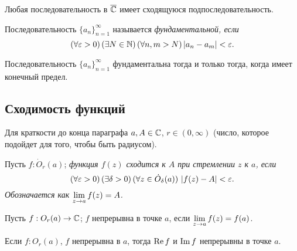 \begin{proposition}
	Любая последовательность в $\overline {\mathbb{C}}$ имеет сходящуюся подпоследовательность.
\end{proposition}


\begin{definition}
	Последовательность ${\{ a_n \}}_{n = 1}^\infty$ называется \it{фундаментальной}, если
	\[
		(\forall \varepsilon > 0) \, (\exists N \in \mathbb{N}) \, (\forall n, m > N) \, \mathopen{}\left\lvert a_n - a_m\right\rvert\mathclose{} < \varepsilon.
	\]
\end{definition}

\begin{proposition}
	Последовательность ${\{ a_n \}}_{n = 1}^\infty$ фундаментальна тогда и только тогда, когда имеет конечный предел.
\end{proposition}

\subsection{Сходимость функций}

Для краткости до конца параграфа $a, A \in \mathbb{C}$, $r \in (0, \infty)$ (число, которое подойдет для того, чтобы быть радиусом).

\begin{definition}
	Пусть $f: \dot{O}_r(a)$; \it{функция} $f(z)$ \it{сходится} к $A$ при стремлении $z$ к $a$, если
	\[
		(\forall \varepsilon > 0) \, (\exists \delta > 0) \, (\forall z \in \dot{O}_\delta(a)) \,\, \mathopen{}\left\lvert f(z) - A\right\rvert\mathclose{} < \varepsilon.
	\]
	Обозначается как $\lim\limits_{z \to a} f(z) = A$.
\end{definition}

\begin{definition}
	Пусть $f: O_r(a) \to \mathbb{C}$; $f$ непрерывна в точке $a$, если $\lim\limits_{z \to a} f(z) = f(a)$.
\end{definition}

\begin{note}
	Если $f: O_r(a)$, $f$ непрерывна в $a$, тогда $\operatorname{Re} f$ и $\operatorname{Im} f$ непрерывны в точке $a$.
\end{note}



